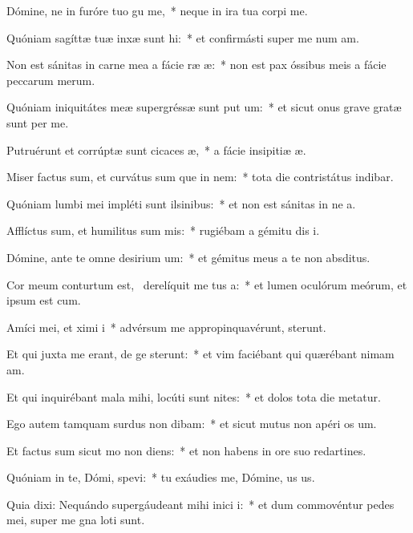 \item Dómine, ne in furóre tuo gu me,~* neque in ira tua corpi me.
\item Quóniam sagíttæ tuæ inxæ sunt hi:~* et confirmásti super me num am.
\item Non est sánitas in carne mea a fácie ræ æ:~* non est pax óssibus meis a fácie peccarum merum.
\item Quóniam iniquitátes meæ supergréssæ sunt put um:~* et sicut onus grave gratæ sunt per me.
\item Putruérunt et corrúptæ sunt cicaces æ,~* a fácie insipitiæ æ.
\item Miser factus sum, et curvátus sum que in nem:~* tota die contristátus indibar.
\item Quóniam lumbi mei impléti sunt ilsinibus:~* et non est sánitas in ne a.
\item Afflíctus sum, et humilitus sum mis:~* rugiébam a gémitu dis i.
\item Dómine, ante te omne desirium um:~* et gémitus meus a te non  absditus.
\item Cor meum conturtum est,~\pscross{} derelíquit me tus a:~* et lumen oculórum meórum, et ipsum  est cum.
\item Amíci mei, et ximi i~* advérsum me appropinquavérunt,  sterunt.
\item Et qui juxta me erant, de ge sterunt:~* et vim faciébant qui quærébant nimam am.
\item Et qui inquirébant mala mihi, locúti sunt nites:~* et dolos tota die metatur.
\item Ego autem tamquam surdus non dibam:~* et sicut mutus non apéri os um.
\item Et factus sum sicut mo non diens:~* et non habens in ore suo redartines.
\item Quóniam in te, Dómi, spevi:~* tu exáudies me, Dómine, us us.
\item Quia dixi: Nequándo supergáudeant mihi inici i:~* et dum commovéntur pedes mei, super me gna loti sunt.
